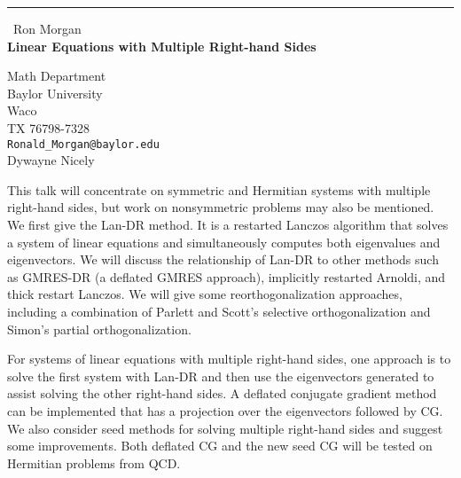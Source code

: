 \documentclass{report}
\begin{document}
\begin{center}
\rule{6in}{1pt} \
{\large Ron Morgan \\
{\bf Linear Equations with Multiple Right-hand Sides}}

Math Department \\ Baylor University \\ Waco \\ TX 76798-7328
\\
{\tt Ronald{\_}Morgan@baylor.edu}\\
Dywayne Nicely\end{center}

This talk will concentrate on symmetric and Hermitian systems with
multiple right-hand sides, but work on nonsymmetric problems may also be
mentioned. We first give the Lan-DR method. It is a restarted Lanczos
algorithm that solves a system of linear equations and simultaneously
computes both eigenvalues and eigenvectors. We will discuss the
relationship of Lan-DR to other methods such as GMRES-DR (a deflated
GMRES approach), implicitly restarted Arnoldi, and thick restart Lanczos.
We will give some reorthogonalization approaches, including a combination
of Parlett and Scott's selective orthogonalization and Simon's partial
orthogonalization.

For systems of linear equations with multiple right-hand sides, one
approach is to solve the first system with Lan-DR and then use the
eigenvectors generated to assist solving the other right-hand sides. A
deflated conjugate gradient method can be implemented that has a
projection over the eigenvectors followed by CG. We also consider seed
methods for solving multiple right-hand sides and suggest some
improvements. Both deflated CG and the new seed CG will be tested on
Hermitian problems from QCD.
\end{document}
